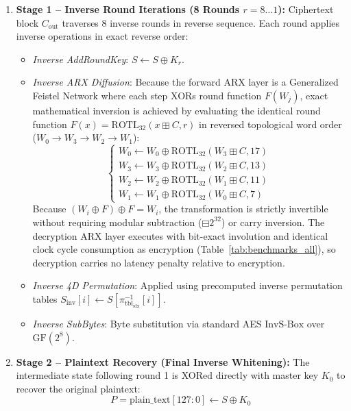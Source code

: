 \documentclass[10pt,twocolumn]{article}
\begin{document}
\begin{enumerate}
    \item \textbf{Stage 1 -- Inverse Round Iterations (8 Rounds $r = 8 \dots 1$):} Ciphertext block $C_{\text{out}}$ traverses 8 inverse rounds in reverse sequence. Each round applies inverse operations in exact reverse order:
    \begin{itemize}
        \item \emph{Inverse AddRoundKey}: $S \leftarrow S \oplus K_r$.
        \item \emph{Inverse ARX Diffusion}: Because the forward ARX layer is a Generalized Feistel Network where each step XORs round function $F(W_j)$, exact mathematical inversion is achieved by evaluating the identical round function $F(x) = \text{ROTL}_{32}(x \boxplus C, r)$ in reversed topological word order ($W_0 \to W_3 \to W_2 \to W_1$):
        \begin{equation}
        \begin{cases}
            W_0 \leftarrow W_0 \oplus \text{ROTL}_{32}(W_3 \boxplus C, 17) \\
            W_3 \leftarrow W_3 \oplus \text{ROTL}_{32}(W_2 \boxplus C, 13) \\
            W_2 \leftarrow W_2 \oplus \text{ROTL}_{32}(W_1 \boxplus C, 11) \\
            W_1 \leftarrow W_1 \oplus \text{ROTL}_{32}(W_0 \boxplus C, 7)
        \end{cases}
        \end{equation}
        Because $(W_i \oplus F) \oplus F = W_i$, the transformation is strictly invertible without requiring modular subtraction ($\boxminus 2^{32}$) or carry inversion. The decryption ARX layer executes with bit-exact involution and identical clock cycle consumption as encryption (Table~\ref{tab:benchmarks_all}), so decryption carries no latency penalty relative to encryption.
        \item \emph{Inverse 4D Permutation}: Applied using precomputed inverse permutation tables $S_{\text{inv}}[i] \leftarrow S[\pi_{\text{tbl}_{\text{idx}}}^{-1}[i]]$.
        \item \emph{Inverse SubBytes}: Byte substitution via standard AES $\text{InvS-Box}$ over $\text{GF}(2^8)$.
    \end{itemize}
    
    \item \textbf{Stage 2 -- Plaintext Recovery (Final Inverse Whitening):} The intermediate state following round 1 is XORed directly with master key $K_0$ to recover the original plaintext:
    \begin{equation}
        P = \text{plain\_text}[127:0] \leftarrow S \oplus K_0
    \end{equation}
\end{enumerate}
\end{document}
